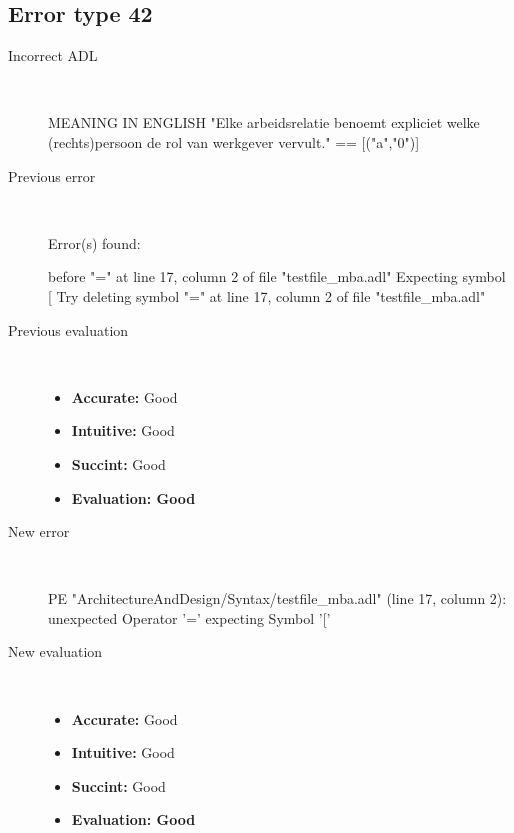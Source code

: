 \subsection{Error type 42}
  \begin{description}
  \item[Incorrect ADL]~\\
\begin{adl}
MEANING IN ENGLISH "Elke arbeidsrelatie benoemt expliciet welke (rechts)persoon de rol van werkgever vervult."
== [("a","0")]        \end{adl}
  \item[Previous error]~\\
\begin{haskell}
Error(s) found:

before "=" at line 17, column 2 of file "testfile_mba.adl"
Expecting symbol [
Try deleting symbol "=" at line 17, column 2 of file "testfile_mba.adl"
\end{haskell}
  \item[Previous evaluation]~\\
    \begin{itemize}
    \item \textbf{Accurate:} Good
    \item \textbf{Intuitive:} Good
    \item \textbf{Succint:} Good
    \item \textbf{Evaluation: Good}
    \end{itemize}
  \item[New error]~\\
\begin{haskell}
PE "ArchitectureAndDesign/Syntax/testfile_mba.adl" (line 17, column 2):
unexpected Operator '='
expecting Symbol '['\end{haskell}
  \item[New evaluation]~\\
    \begin{itemize}
    \item \textbf{Accurate:} Good
    \item \textbf{Intuitive:} Good
    \item \textbf{Succint:} Good
    \item \textbf{Evaluation: Good
}
    \end{itemize}
  \end{description}

\hrulefill

